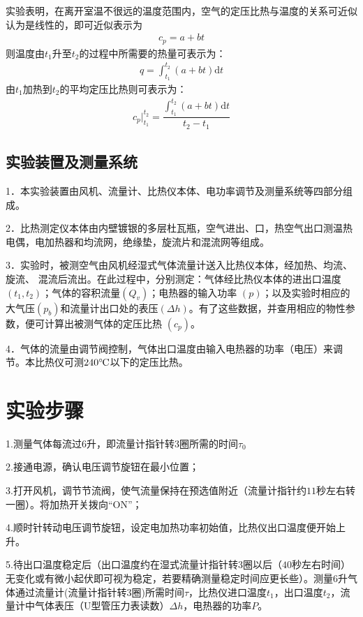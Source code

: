 \documentclass[UTF8,a4paper,10pt]{ctexart}
\def \d {\mathrm{d}}
\def \celsius{\ensuremath{^\circ\hspace{-0.09em}\mathrm{C}}}
\begin{document}
	
	实验表明，在离开室温不很远的温度范围内，空气的定压比热与温度的关系可近似认为是线性的，即可近似表示为
	\begin{align}
	c_{p}=a+bt
	\end{align}
	则温度由$t_{1}$升至$t_{2}$的过程中所需要的热量可表示为：
	\begin{align}
	q=\int_{t_{1}}^{t_{2}} (a+bt)\d t 
	\end{align}
	由$t_{1}$加热到$t_{2}$的平均定压比热则可表示为：
	\begin{align}
	c_{p}\big|^{t_{2}}_{t_{1}}=\dfrac{\int_{t_{1}}^{t_{2}} (a+bt)\d t }{t_{2}-t_{1}}
	\end{align}
	\subsection{实验装置及测量系统}
	1．本实验装置由风机、流量计、比热仪本体、电功率调节及测量系统等四部分组成。
	
	
	2．比热测定仪本体由内壁镀银的多层杜瓦瓶，空气进出、口，热空气出口测温热电偶，电加热器和均流网，绝缘垫，旋流片和混流网等组成。
	
	
	3．实验时，被测空气由风机经湿式气体流量计送入比热仪本体，经加热、均流、旋流、 混流后流出。在此过程中，分别测定：气体经比热仪本体的进出口温度
	$(t_{1},t_{2})$；气体的容积流量$(Q_{v})$；电热器的输入功率
	$(p)$；以及实验时相应的大气压$(p_{b})$和流量计出口处的表压$(\Delta h)$。有了这些数据，并查用相应的物性参数，便可计算出被测气体的定压比热 $(c_{p})$。
	
	
	4．气体的流量由调节阀控制，气体出口温度由输入电热器的功率（电压）来调节。本比热仪可测$240\celsius$以下的定压比热。
	\section{实验步骤}
	1.测量气体每流过$6$升，即流量计指针转$3$圈所需的时间$\tau_{0}$
	
	
	2.接通电源，确认电压调节旋钮在最小位置；
	
	
	3.打开风机，调节节流阀，使气流量保持在预选值附近（流量计指针约$11$秒左右转一圈）。将加热开关拨向“ON”；
	
	
	4.顺时针转动电压调节旋钮，设定电加热功率初始值，比热仪出口温度便开始上升。
	
	
	5.待出口温度稳定后（出口温度约在湿式流量计指针转3圈以后（$40$秒左右时间）无变化或有微小起伏即可视为稳定，若要精确测量稳定时间应更长些）。测量$6$升气体通过流量计(流量计指针转3圈)所需时间$\tau$，比热仪进口温度$t_{1}$，出口温度$t_{2}$，流量计中气体表压（U型管压力表读数）$\Delta h$，电热器的功率$P$。
	
\end{document}
